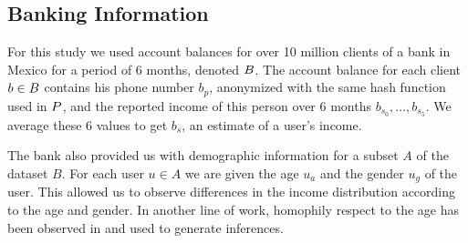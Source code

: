 \subsection{Banking Information}


For this study we used account balances for over 10 million clients of a bank in Mexico for a period of 6 months, denoted \( \mathlarger{B} \). 
The account balance for each client \( b \in \mathlarger{B} \) contains his phone number \( b_p \), anonymized with the same hash function used in \( \mathlarger{P} \), and the reported income of this person over 6 months \( b_{s_0}, \ldots, b_{s_5} \). We average these 6 values to get \( b_s \), an estimate of a user's income.

The bank also provided us with demographic information for a subset \( A \) of the dataset \( B \). For each user \( u \in A \) we are given  the age \( u_a \) and the gender \( u_g \) of the user. This allowed us to observe differences in the income distribution according to the age and gender. In another line of work, homophily respect to the age has been observed in \cite{brea2014} and used to generate inferences.
